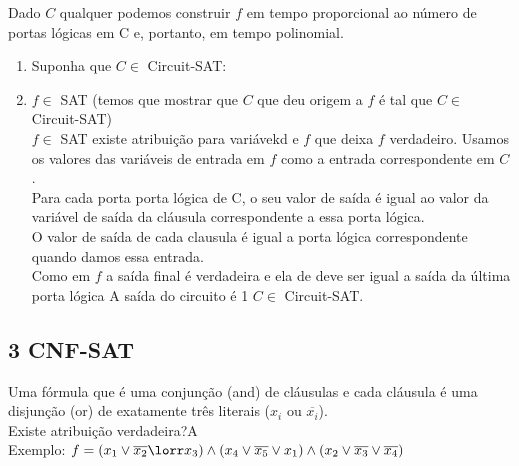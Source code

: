 \documentclass[a4paper,oneside,article,table]{article}
\begin{document}
            Dado $C$ qualquer podemos construir $f$ em tempo proporcional ao número de portas lógicas em C e, portanto, em tempo polinomial.
            \begin{enumerate}
                \item Suponha que $C \in$ Circuit-SAT:

                \item $f \in$ SAT (temos que mostrar que $C$ que deu origem a $f$ é tal que $C \in$ Circuit-SAT)\\
                    $f \in$ SAT \rightarrow existe atribuição para variávekd e $f$ que deixa $f$ verdadeiro. Usamos os valores das variáveis de entrada em $f$ como a entrada correspondente em $C$.\\
                    Para cada porta porta lógica de C, o seu valor de saída é igual ao valor da variável de saída da cláusula correspondente a essa porta lógica.\\
                    O valor de saída de cada clausula é igual a porta lógica correspondente quando damos essa entrada.\\
                    Como em $f$ a saída final é verdadeira e ela de deve ser igual a saída da última porta lógica \rightarrow A saída do circuito é 1 \rightarrow $C \in$ Circuit-SAT.
            \end{enumerate}

            \subsection{3 CNF-SAT}
            Uma fórmula que é uma conjunção (and) de cláusulas e cada cláusula é uma disjunção (or) de exatamente três literais ($x_i$ ou $\overline{x_i}$).\\
            Existe atribuição verdadeira?A\\
            Exemplo: $f = (x_1 \lor \overline{x_2} \lorr x_3)\land(x_4 \lor \overline{x_5} \lor x_1)\land(x_2 \lor \overline{x_3} \lor \overline{x_4})$
\end{document}
